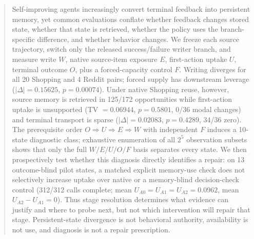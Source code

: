 \begin{abstract}
Self-improving agents increasingly convert terminal feedback into persistent memory, yet common evaluations conflate whether feedback changes stored state, whether that state is retrieved, whether the policy uses the branch-specific difference, and whether behavior changes. We freeze each source trajectory, switch only the released success/failure writer branch, and measure write $W$, native source-item exposure $E$, first-action uptake $U$, terminal outcome $O$, plus a forced-capacity control $F$. Writing diverges for all 20 Shopping and 4 Reddit pairs; forced supply has downstream leverage ($|\Delta|=0.15625$, $p=0.00074$). Under native Shopping reuse, however, source memory is retrieved in 125/172 opportunities while first-action uptake is unsupported (TV $=0.06944$, $p=0.5801$, 0/36 modal changes) and terminal transport is sparse ($|\Delta|=0.02083$, $p=0.4289$, 34/36 zero). The prerequisite order $O\Rightarrow U\Rightarrow E\Rightarrow W$ with independent $F$ induces a 10-state diagnostic class; exhaustive enumeration of all $2^5$ observation subsets shows that only the full $W/E/U/O/F$ basis separates every state. We then prospectively test whether this diagnosis directly identifies a repair: on 13 outcome-blind pilot states, a matched explicit memory-use check does not selectively increase uptake over native or a memory-blind decision-check control (312/312 calls complete; mean $U_{A0}=U_{A1}=U_{A2}=0.0962$, mean $U_{A2}-U_{A1}=0$). Thus stage resolution determines what evidence can justify and where to probe next, but not which intervention will repair that stage. Persistent-state divergence is not behavioral authority, availability is not use, and diagnosis is not a repair prescription.
\end{abstract}
